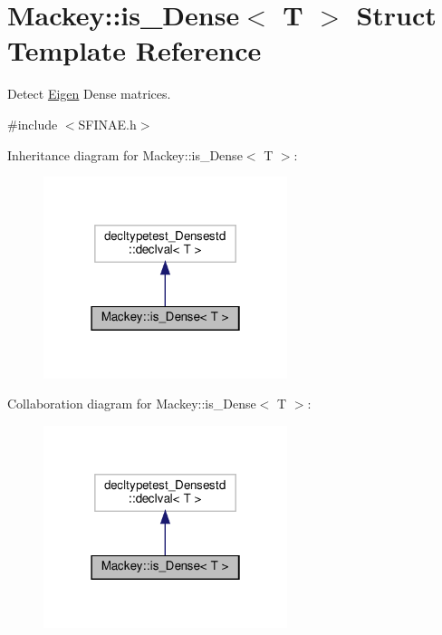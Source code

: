 \hypertarget{structMackey_1_1is__Dense}{}\section{Mackey\+:\+:is\+\_\+\+Dense$<$ T $>$ Struct Template Reference}
\label{structMackey_1_1is__Dense}


Detect \hyperlink{namespaceEigen}{Eigen} Dense matrices.  




{\ttfamily \#include $<$S\+F\+I\+N\+A\+E.\+h$>$}



Inheritance diagram for Mackey\+:\+:is\+\_\+\+Dense$<$ T $>$\+:\nopagebreak
\begin{figure}[H]
\begin{center}
\leavevmode
\includegraphics[width=202pt]{structMackey_1_1is__Dense__inherit__graph}
\end{center}
\end{figure}


Collaboration diagram for Mackey\+:\+:is\+\_\+\+Dense$<$ T $>$\+:\nopagebreak
\begin{figure}[H]
\begin{center}
\leavevmode
\includegraphics[width=202pt]{structMackey_1_1is__Dense__coll__graph}
\end{center}
\end{figure}


